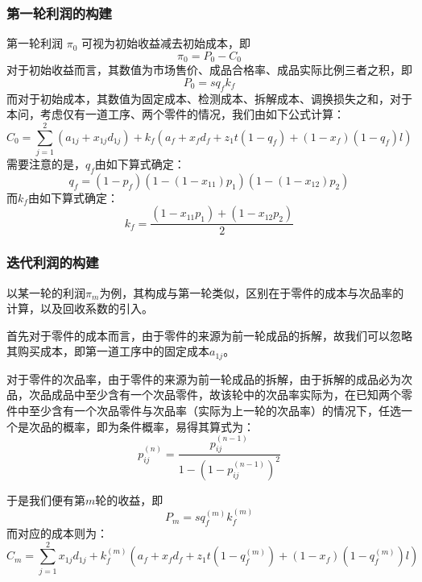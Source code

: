 \documentclass[withoutpreface,bwprint]{cumcmthesis}
\begin{document}
\subsubsection{第一轮利润的构建}
第一轮利润 $\pi_0$ 可视为初始收益减去初始成本，即
\begin{equation}
\pi_0=P_0-C_0
\end{equation}
对于初始收益而言，其数值为市场售价、成品合格率、成品实际比例三者之积，即
\begin{equation}
P_0= s q_f k_f
\end{equation}
而对于初始成本，其数值为固定成本、检测成本、拆解成本、调换损失之和，对于本问，考虑仅有一道工序、两个零件的情况，我们由如下公式计算：
\begin{equation}
C_0=\sum_{j=1}^2 (a_{1j}+x_{1j}d_{1j})+k_f (a_f+ x_fd_f + z_1t(1-q_f)+(1-x_f)(1-q_f)l)
\end{equation}
需要注意的是，$q_f$由如下算式确定：
\begin{equation}
q_f=(1-p_f)(1-(1-x_{11})p_1)(1-(1-x_{12})p_2)
\end{equation}
而$k_f$由如下算式确定：
\begin{equation}
k_f=\frac{(1-x_{11}p_1)+(1-x_{12}p_2)}{2}
\end{equation}
\subsubsection{迭代利润的构建}
以某一轮的利润$\pi_m$为例，其构成与第一轮类似，区别在于零件的成本与次品率的计算，以及回收系数的引入。

首先对于零件的成本而言，由于零件的来源为前一轮成品的拆解，故我们可以忽略其购买成本，即第一道工序中的固定成本$a_{1j}$。

对于零件的次品率，由于零件的来源为前一轮成品的拆解，由于拆解的成品必为次品，次品成品中至少含有一个次品零件，故该轮中的次品率实际为，在已知两个零件中至少含有一个次品零件与次品率（实际为上一轮的次品率）的情况下，任选一个是次品的概率，即为条件概率，易得其算式为：
\begin{equation}
p_{ij}^{(n)}=\frac{p_{ij}^{(n-1)}}{1-(1-p_{ij}^{(n-1)})^2}
\end{equation}

于是我们便有第$m$轮的收益，即
\begin{equation}
P_m=s q_f^{(m)} k_f^{(m)}
\end{equation}
而对应的成本则为：
\begin{equation}
C_m=\sum_{j=1}^2 x_{1j}d_{1j}+k_f^{(m)} (a_f+ x_fd_f + z_1t(1-q_f^{(m)})+(1-x_f)(1-q_f^{(m)})l)
\end{equation}
\end{document}
